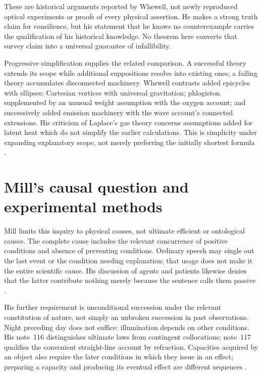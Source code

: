 These are historical arguments reported by Whewell, not newly reproduced
optical experiments or proofs of every physical assertion.
He makes a strong truth claim for consilience, but his statement that he
knows no counterexample carries the qualification of his historical
knowledge. No theorem here converts that survey claim into a universal
guarantee of infallibility.

Progressive simplification supplies the related comparison.
A successful theory extends its scope while additional suppositions
resolve into existing ones; a failing theory accumulates disconnected
machinery. Whewell contrasts added epicycles with ellipses; Cartesian
vortices with universal gravitation; phlogiston supplemented by an
unusual weight assumption with the oxygen account; and successively
added emission machinery with the wave account's connected extensions.
His criticism of Laplace's gas theory concerns assumptions added for
latent heat which do not simplify the earlier calculations.
This is simplicity under expanding explanatory scope, not merely
preferring the initially shortest formula
\parencite[II.V.12--13, pp.~90--96]{Whewell1858NovumPG}.

\section{Mill's causal question and experimental methods}
\label{sec:p15-wm-methods}

Mill limits this inquiry to physical causes, not ultimate efficient
or ontological causes. The complete cause includes the relevant
concurrence of positive conditions and absence of preventing conditions.
Ordinary speech may single out the last event or the condition needing
explanation; that usage does not make it the entire scientific cause.
His discussion of agents and patients likewise denies that the latter
contribute nothing merely because the sentence calls them passive
\parencite[III.V.2--4, including notes~114--115]{Mill1882SystemLogicPG}.

His further requirement is unconditional succession under the relevant
constitution of nature, not simply an unbroken succession in past
observations. Night preceding day does not suffice: illumination depends
on other conditions. His note~116 distinguishes ultimate laws from
contingent collocations; note~117 qualifies the convenient straight-line
account by refraction. Capacities acquired by an object also require
the later conditions in which they issue in an effect; preparing a
capacity and producing its eventual effect are different sequences
\parencite[III.V.5--6 and notes~116--119]{Mill1882SystemLogicPG}.

